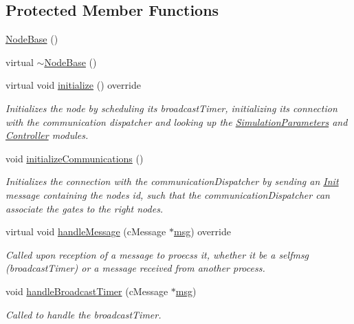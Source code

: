 \subsection*{Protected Member Functions}
\begin{DoxyCompactItemize}
\item 
\hyperlink{class_node_base_ab6ea4e77947d5b9b8da66d37dc432e7f}{Node\+Base} ()
\item 
virtual \hyperlink{class_node_base_a2fd7f7080282b6af95ba0b09fd30679d}{$\sim$\+Node\+Base} ()
\item 
virtual void \hyperlink{class_node_base_af7910c39553111295b66c88742d1198a}{initialize} () override
\begin{DoxyCompactList}\small\item\em Initializes the node by scheduling it\textquotesingle{}s broadcast\+Timer, initializing its connection with the communication dispatcher and looking up the \hyperlink{class_simulation_parameters}{Simulation\+Parameters} and \hyperlink{class_controller}{Controller} modules. \end{DoxyCompactList}\item 
void \hyperlink{class_node_base_a2077b2a599f55050603268dbf8fff6a7}{initialize\+Communications} ()
\begin{DoxyCompactList}\small\item\em Initializes the connection with the communication\+Dispatcher by sending an \hyperlink{class_init}{Init} message containing the node\textquotesingle{}s id, such that the communication\+Dispatcher can associate the gates to the right nodes. \end{DoxyCompactList}\item 
virtual void \hyperlink{class_node_base_add2450264be5dd616f9f9ac94e83b988}{handle\+Message} (c\+Message $\ast$\hyperlink{_controller_8h_afa0f3b802fbc219228f7bb97996fa558}{msg}) override
\begin{DoxyCompactList}\small\item\em Called upon reception of a message to proecss it, whether it be a selfmsg (broadcast\+Timer) or a message received from another process. \end{DoxyCompactList}\item 
void \hyperlink{class_node_base_a65273f043d18d6f021199fba050700b5}{handle\+Broadcast\+Timer} (c\+Message $\ast$\hyperlink{_controller_8h_afa0f3b802fbc219228f7bb97996fa558}{msg})
\begin{DoxyCompactList}\small\item\em Called to handle the broadcast\+Timer. \end{DoxyCompactList}\item 

\end{DoxyCompactItemize}
